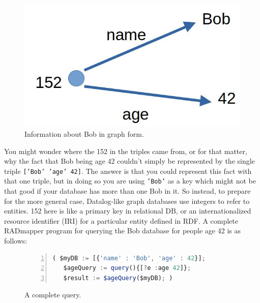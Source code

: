 \documentclass[10pt,letterpaper]{article} %
\newcommand{\stt}[1]{\texttt{#1}} %
\begin{document}
\begin{figure}[H]
  \caption{Information about Bob in graph form.}
  \label{fig:bob-as-a-graph}
     \includegraphics[scale=0.15]{bob-age-42.jpg}
  \centering
\end{figure}

You might wonder where the 152 in the triples came from, or for that matter, why the fact that Bob being age 42 couldn't
simply be represented by the single triple \stt{['Bob' 'age' 42]}.
The answer is that you could represent this fact with that one triple, but in doing so you are using \stt{'Bob'} as a key
which might not be that good if your database has more than one Bob in it.
So instead, to prepare for the more general case, Datalog-like graph databases use integers to refer to entities.
152 here is like a primary key in relational DB, or an internationalized resource identifier (IRI) for a particular entity defined in RDF.
A complete RADmapper program for querying the Bob database for people age 42 is as follows:

\begin{figure}[H]
  \caption{A complete query.}
  \label{code:bob-age}
\begin{lstlisting}[language=JavaScript,numberstyle=\scriptsize,basicstyle=\ttfamily\scriptsize,numbers=left,stepnumber=1,breaklines=true]
 ( $myDB := [{'name' : 'Bob', 'age' : 42}];
   $ageQuery := query(){[?e :age 42]};
   $result := $ageQuery($myDB); )
\end{lstlisting}
\end{figure} \vspace{-3em}

\end{document}
